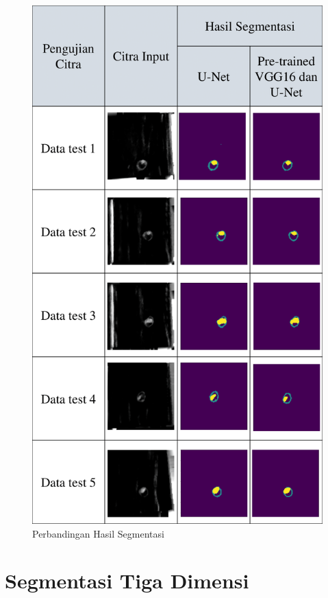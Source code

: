 \begin{figure}[htbp]
	\centering
	\includegraphics[scale= 0.4]{bab4/result-segmentation_rekonstruksi/result-segmentation_rekonstruksi-1.png}
	\caption{Perbandingan Hasil Segmentasi}
	\label{fig:result-label-rekonstruksi}
\end{figure}



\section{Segmentasi Tiga Dimensi}

